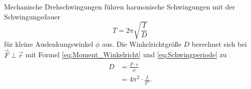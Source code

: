 Mechanische Drehschwingungen führen harmonische Schwingungen mit der Schwingungsdauer
\begin{equation}
	\label{eq:Schwingperiode}
	T=2\mathup{\pi} \sqrt{\frac{I}{D}}
\end{equation}
für kleine Auslenkungswinkel $\phi$ aus. 
Die Winkelrichtgröße $D$ berechnet sich bei $\vec{F}\perp \vec{r}$ mit Formel \eqref{eq:Moment_Winkelricht} und \eqref{eq:Schwingperiode} zu
\begin{align}
	\begin{split}
	\label{eq:Winkelricht}
	D&=\frac{F\cdot r}{\phi}\\
	 &= 4\mathup{\pi^{2}}\cdot\frac{I}{T^2}. 
	\end{split}
\end{align}

